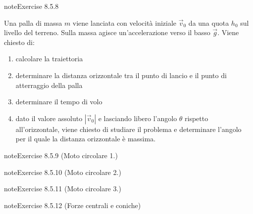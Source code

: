 \documentclass[letterpaper,10pt,italian]{jupyterBook}
\begin{document}
\begin{sphinxadmonition}{note}{Exercise 8.5.8}



\sphinxAtStartPar
Una palla di massa \(m\) viene lanciata con velocità iniziale \(\vec{v}_0\) da una quota \(h_0\) sul livello del terreno. Sulla massa agisce un’accelerazione verso il basso \(\vec{g}\). Viene chiesto di:
\begin{enumerate}
%
\item {} 
\sphinxAtStartPar
calcolare la traiettoria

\item {} 
\sphinxAtStartPar
determinare la distanza orizzontale tra il punto di lancio e il punto di atterraggio della palla

\item {} 
\sphinxAtStartPar
determinare il tempo di volo

\item {} 
\sphinxAtStartPar
dato il valore assoluto \(|\vec{v}_0|\) e lasciando libero l’angolo \(\theta\) rispetto all’orizzontale, viene chiesto di studiare il problema e determinare l’angolo per il quale la distanza orizzontale è massima.

\end{enumerate}
\end{sphinxadmonition}
 \label{exercise:ch/mechanics/kinematics-problems-exercise-8}

\begin{sphinxadmonition}{note}{Exercise 8.5.9 (Moto circolare 1.)}


\end{sphinxadmonition}
 \label{exercise:ch/mechanics/kinematics-problems-exercise-9}

\begin{sphinxadmonition}{note}{Exercise 8.5.10 (Moto circolare 2.)}


\end{sphinxadmonition}
 \label{exercise:ch/mechanics/kinematics-problems-exercise-10}

\begin{sphinxadmonition}{note}{Exercise 8.5.11 (Moto circolare 3.)}


\end{sphinxadmonition}
 \label{exercise:ch/mechanics/kinematics-problems-exercise-11}

\begin{sphinxadmonition}{note}{Exercise 8.5.12 (Forze centrali e coniche)}


\end{sphinxadmonition}
 \label{exercise:ch/mechanics/kinematics-problems-exercise-12}
\end{document}
